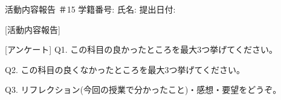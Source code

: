 活動内容報告 ＃15
学籍番号:
氏名:
提出日付:

[活動内容報告]


[アンケート]
Q1. この科目の良かったところを最大3つ挙げてください。

Q2. この科目の良くなかったところを最大3つ挙げてください。

Q3. リフレクション(今回の授業で分かったこと)・感想・要望をどうぞ。